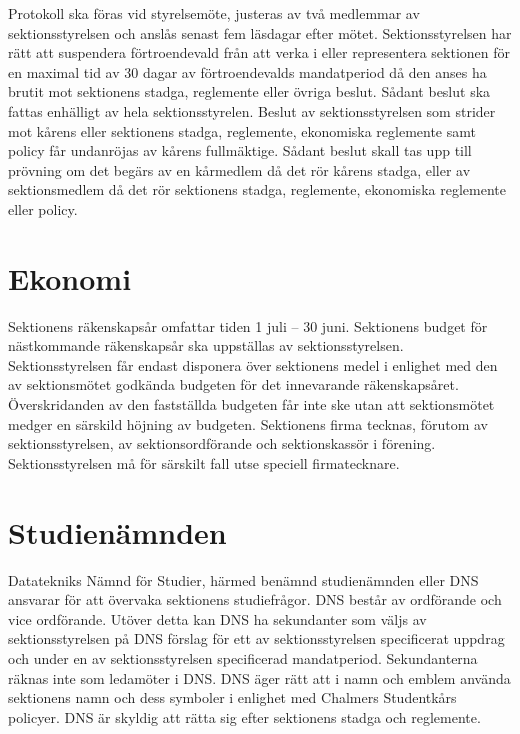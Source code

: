 \documentclass[a4paper]{dteklag}
\begin{document}
\para Protokoll ska föras vid styrelsemöte, justeras av två medlemmar av sektionsstyrelsen och anslås senast fem läsdagar efter mötet.
 Sektionsstyrelsen har rätt att suspendera förtroendevald från att verka i eller representera sektionen för en maximal tid av 30 dagar av förtroendevalds mandatperiod då den anses ha brutit mot sektionens stadga, reglemente eller övriga beslut.
\stycke Sådant beslut ska fattas enhälligt av hela sektionsstyrelen.
\para[Överklagande] Beslut av sektionsstyrelsen som strider mot kårens eller sektionens stadga, reglemente, ekonomiska reglemente samt policy får undanröjas av kårens fullmäktige.
\stycke Sådant beslut skall tas upp till prövning om det begärs av en kårmedlem då det rör kårens stadga, eller av sektionsmedlem då det rör sektionens stadga, reglemente, ekonomiska reglemente eller policy.


\section{Ekonomi}
\para[Räkenskapsår]
Sektionens räkenskapsår omfattar tiden 1 juli – 30 juni.
\para[Budget] Sektionens budget för nästkommande räkenskapsår ska uppställas av sektionsstyrelsen.
\para Sektionsstyrelsen får endast disponera över sektionens medel i enlighet med den av sektionsmötet godkända budgeten för det innevarande räkenskapsåret.
\para Överskridanden av den fastställda budgeten får inte ske utan att sektionsmötet medger en särskild höjning av budgeten.
\para[Firmateckning] Sektionens firma tecknas, förutom av sektionsstyrelsen, av sektionsordförande och sektionskassör i förening.
\stycke Sektionsstyrelsen må för särskilt fall utse speciell firmatecknare.

\section{Studienämnden}
\para Datatekniks Nämnd för Studier, härmed benämnd studienämnden eller DNS ansvarar för att övervaka sektionens studiefrågor.
\para DNS består av ordförande och vice ordförande.
\stycke Utöver detta kan DNS ha sekundanter som
väljs av sektionsstyrelsen på DNS förslag för ett av sektionsstyrelsen specificerat uppdrag och under en av sektionsstyrelsen specificerad mandatperiod.
\stycke Sekundanterna räknas inte som ledamöter i DNS.
\para DNS äger rätt att i namn och emblem använda sektionens namn och dess symboler i enlighet med Chalmers Studentkårs policyer.
\para DNS är skyldig att rätta sig efter sektionens stadga och reglemente.
\end{document}
